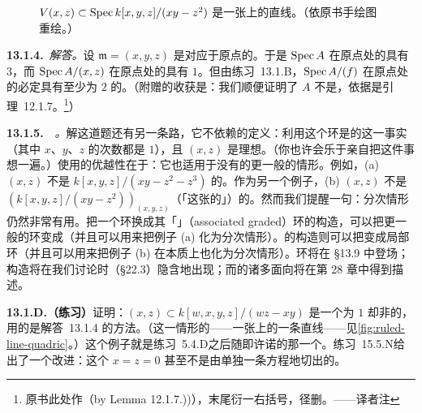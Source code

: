 \begin{figure}[htbp]
\centering
{}
\caption{$V(x,z)\subset\operatorname{Spec} k[x,y,z]/(xy-z^2)$ 是一张\trCone{}上的直线。（依原书手绘图重绘。）}\label{fig:cone-line-xyz}
\end{figure}

\textbf{13.1.4.}\ \emph{解答。}\quad 设 $\mathfrak{m}=(x,y,z)$ 是对应于原点的\trMaximalIdeal。于是 $\operatorname{Spec} A$ 在原点处的\trZariski{}\trTangentSpace{}具有\trDimension{} $3$，而 $\operatorname{Spec} A/(x,z)$ 在原点处的\trZariski{}\trTangentSpace{}具有\trDimension{} $1$。但由\mbox{练习~13.1.B}，$\operatorname{Spec} A/(f)$ 在原点处的\trZariski{}\trTangentSpace{}必定具有至少为 $2$ 的\trDimension。（附赠的收获是：我们顺便证明了 $A$ 不是\trUFD，依据是引理~12.1.7。\footnote{原书此处作（by Lemma 12.1.7.))），末尾衍一右括号，径删。——译者注}）

\textbf{13.1.5.}\ \hard\ \emph{\trhRemark{}。}\quad 解这道题还有另一条路，它不依赖\trZariski{}\trTangentSpace{}的定义：利用这个环是\trGrading{}的这一事实（其中 $x$、$y$、$z$ 的次数都是 $1$），且\trIdeal{} $(x,z)$ 是\trHomogeneous{}理想。（你也许会乐于亲自把这件事想一遍。）使用\trTangentSpace{}的优越性在于：它也适用于没有\trGrading{}的更一般的情形。例如，(a) $(x,z)$ 不是 $k[x,y,z]/(xy-z^2-z^3)$ 的\trPrincipalIdeal。作为另一个例子，(b) $(x,z)$ 不是\trLocalRing{} $(k[x,y,z]/(xy-z^2))_{(x,y,z)}$（「这张\trCone{}的\trGerm」）的\trPrincipalIdeal。然而我们提醒一句：分次情形仍然非常有用。把一个\trFiltered{}环换成其「\trAssociatedGraded」（associated graded）环的构造，可以把更一般的环变成\trGradedRing（并且可以用来把例子 (a) 化为分次情形）。\trCompletion{}的构造则可以把\trLocalRing{}变成\trGrading{}局部环（并且可以用来把例子 (b) 在本质上也化为分次情形）。\trFiltered{}环将在 \S13.9 中登场；\trAssociatedGraded{}构造将在我们讨论\trBlowup{}时（\S22.3）隐含地出现；而\trCompletion{}的诸多面向将在第 28 章中得到描述。

\textbf{13.1.D.（练习）}\quad 证明：$(x,z)\subset k[w,x,y,z]/(wz-xy)$ 是一个\trCodimension{}为 $1$ 却非\trPrincipalIdeal{}的\trIdeal，用的是解答~13.1.4 的方法。（这一情形的\trProjectivization{}——一张\trSmooth{}\trQuadricSurface{}上的一条直线——见\cref{fig:ruled-line-quadric}。）这个例子就是\mbox{练习~5.4.D}之后随即许诺的那一个。\mbox{练习~15.5.N}给出了一个改进：这个\trClosedSubset{} $x=z=0$ 甚至不是由单独一条方程\trSetTheoretic{}地切出的。

